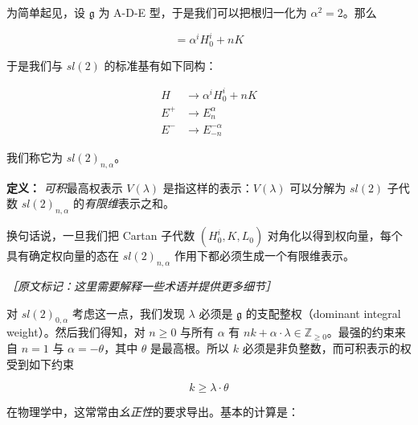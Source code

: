 为简单起见，设 $\mathfrak{g}$ 为 A-D-E 型，于是我们可以把根归一化为 $\alpha^2=2$。那么

\begin{equation}
  [E^\alpha_n,E^{-\alpha}_{-n}]=\alpha^iH^i_0+nK
  \tag{4.131}
  \label{eq:4.131}
\end{equation}

于是我们与 $sl(2)$ 的标准基有如下同构：

\begin{equation}
  \begin{aligned}
    H &\to \alpha^iH^i_0+nK\\
    E^+ &\to E^\alpha_n\\
    E^- &\to E^{-\alpha}_{-n}
  \end{aligned}
  \tag{4.132}
  \label{eq:4.132}
\end{equation}

我们称它为 $sl(2)_{n,\alpha}$。


\textbf{定义：} \emph{可积}最高权表示 $V(\lambda)$ 是指这样的表示：$V(\lambda)$ 可以分解为 $sl(2)$ 子代数 $sl(2)_{n,\alpha}$ 的\emph{有限维}表示之和。

换句话说，一旦我们把 Cartan 子代数 $(H^i_0,K,L_0)$ 对角化以得到权向量，每个具有确定权向量的态在 $sl(2)_{n,\alpha}$ 作用下都必须生成一个有限维表示。

{\small\itshape ［原文标记：这里需要解释一些术语并提供更多细节］}

对 $sl(2)_{0,\alpha}$ 考虑这一点，我们发现 $\lambda$ 必须是 $\mathfrak{g}$ 的支配整权（dominant integral weight）。然后我们得知，对 $n\ge0$ 与所有 $\alpha$ 有 $nk+\alpha\cdot\lambda\in\mathbb{Z}_{\geq0}$。最强的约束来自 $n=1$ 与 $\alpha=-\theta$，其中 $\theta$ 是最高根。所以 $k$ 必须是非负整数，而可积表示的权受到如下约束

\begin{equation}
  k\ge\lambda\cdot\theta
  \tag{4.133}
  \label{eq:4.133}
\end{equation}

在物理学中，这常常由\emph{幺正性}的要求导出。基本的计算是：

